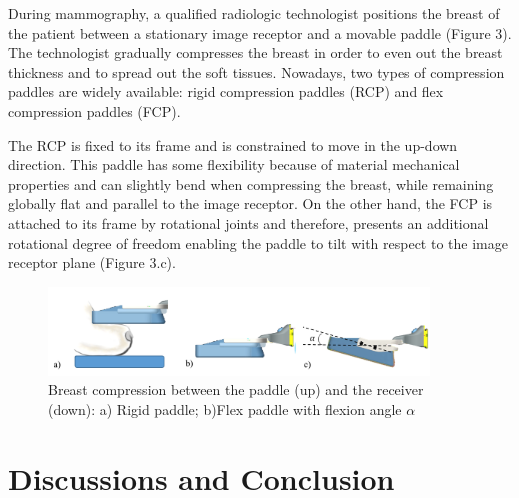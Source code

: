 During mammography, a qualified radiologic technologist positions the breast of the patient between a stationary image receptor and a movable paddle (Figure 3). The technologist gradually compresses the breast in order to even out the breast thickness and to spread out the soft tissues. Nowadays, two types of compression paddles are widely available: rigid compression paddles (RCP) and flex compression paddles (FCP). 


The RCP is fixed to its frame and is constrained to move in the up-down direction. This paddle has some flexibility because of material mechanical properties and can slightly bend when compressing the breast, while remaining globally flat and parallel to the image receptor. On the other hand, the FCP is attached to its frame by rotational joints and therefore, presents an additional rotational degree of freedom enabling the paddle to tilt with respect to the image receptor plane (Figure 3.c). 

\begin{figure}[!h]
\centering
\includegraphics[width=0.9\textwidth,keepaspectratio]{figures/compressionpaddles.png} 
\caption{Breast compression between the paddle (up) and the receiver (down): a) Rigid paddle; b)Flex paddle with flexion angle $\alpha$}\label{fig:compressionpaddles}
\end{figure}




\section{Discussions and Conclusion}\label{section:compression:conclusion}